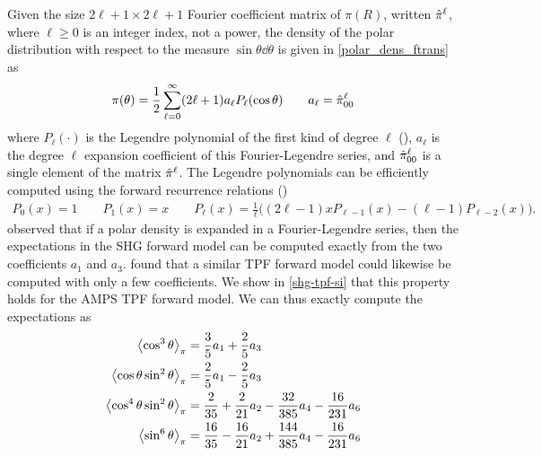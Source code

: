 \documentclass[../../main.tex]{subfiles}
\begin{document}
\begin{refsection}
	Given the size $2\ell + 1 \times 2\ell + 1$ Fourier coefficient matrix of $\pi(R)$, written $\hat{\pi}^\ell$, where $\ell \ge 0$ is an integer index, not a power, the density of the polar distribution with respect to the measure $\sin\theta \dd\theta$ is given in \cref{polar_dens_ftrans} as
	\begin{equation}\label{polar_dens_ftrans_main}
		\pi(\theta) = \frac{1}{2} \sum_{\ell=0}^\infty (2\ell+1) a_\ell P_\ell(\cos\theta) \qquad a_\ell = \hat{\pi}^\ell_{00}
	\end{equation}
	where $P_\ell(\cdot)$ is the Legendre polynomial of the first kind of degree $\ell$ (\cite[Section 18.3]{NIST:DLMF}), $a_\ell$ is the degree $\ell$ expansion coefficient of this Fourier-Legendre series, and $\hat{\pi}^\ell_{00}$ is a single element of the matrix $\hat{\pi}^\ell$.
	The Legendre polynomials can be efficiently computed using the forward recurrence relations (\cite[Section 18.9i]{NIST:DLMF})
	\begin{align*}
		P_0(x) = 1\qquad P_1(x) = x\qquad P_\ell(x) = \frac{1}{\ell} \bigg((2 \ell - 1) x P_{\ell - 1}(x) - (\ell - 1) P_{\ell - 2}(x)\bigg).
	\end{align*}
	\cite{dickIrreducibleTensorAnalysis1985,simpsonSHGMagicAngle1999} observed that if a polar density is expanded in a Fourier-Legendre series, then the expectations in the SHG forward model can be computed exactly from the two coefficients $a_1$ and $a_3$.
	\cite{chenTheoryTwophotonInduced1993} found that a similar TPF forward model could likewise be computed with only a few coefficients.
	We show in \cref{shg-tpf-si} that this property holds for the AMPS TPF forward model.
	We can thus exactly compute the expectations as
	\begin{align}
		\begin{split}
			\left\langle \cos^3\theta \right\rangle_{\pi}              & = \frac{3}{5} a_1 + \frac{2}{5} a_3                                            \\
			\left\langle \cos\theta \sin^2\theta \right\rangle_{\pi}   & = \frac{2}{5} a_1 - \frac{2}{5} a_3                                           \\
			\left\langle \cos^4\theta \sin^2\theta \right\rangle_{\pi} & = \frac{2}{35} + \frac{2}{21} a_2 - \frac{32}{385} a_4 - \frac{16}{231} a_6  \\
			\left\langle \sin^6\theta \right\rangle_{\pi}              & = \frac{16}{35} - \frac{16}{21} a_2 + \frac{144}{385} a_4 - \frac{16}{231} a_6
		\end{split}
	\end{align}


\end{refsection}
\end{document}
